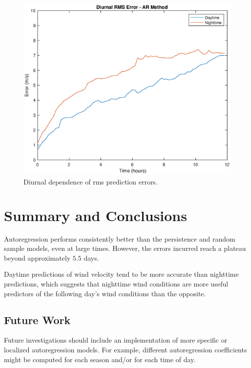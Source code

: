 \documentclass[11pt, oneside]{article}
\begin{document}
\begin{figure}[htb]
\centering
\includegraphics[width=\columnwidth]{figures/DiurnalRMSPredictionError}
\caption{Diurnal dependence of rms prediction errors.}
\label{fig:DiurnalRMS}
\end{figure}

\section{Summary and Conclusions}\label{sec:Conclusions}



Autoregression performs consistently better than the persistence and random sample models, even at large times.
However, the errors incurred reach a plateau beyond approximately $5.5$ days.

Daytime predictions of wind velocity tend to be more accurate than nighttime predictions, which suggests that nighttime wind conditions are more useful predictors of the following day's wind conditions than the opposite.

\subsection{Future Work}
Future investigations should include an implementation of more specific or localized autoregression models.
For example, different autoregression coefficients might be computed for each season and/or for each time of day.




\end{document}
